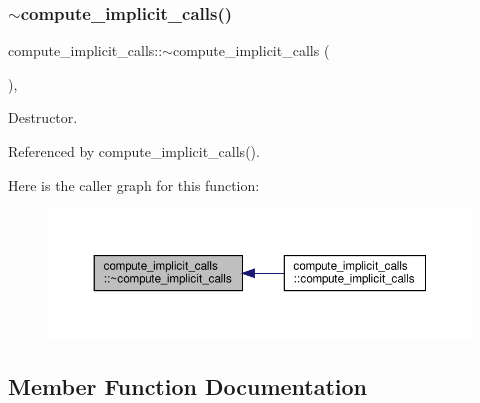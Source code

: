 \subsubsection{\texorpdfstring{$\sim$compute\+\_\+implicit\+\_\+calls()}{~compute\_implicit\_calls()}}
{\footnotesize\ttfamily compute\+\_\+implicit\+\_\+calls\+::$\sim$compute\+\_\+implicit\+\_\+calls (\begin{DoxyParamCaption}{ }\end{DoxyParamCaption})\hspace{0.3cm}{\ttfamily [override]}, {\ttfamily [default]}}



Destructor. 



Referenced by compute\+\_\+implicit\+\_\+calls().

Here is the caller graph for this function\+:
\nopagebreak
\begin{figure}[H]
\begin{center}
\leavevmode
\includegraphics[width=350pt]{db/d74/classcompute__implicit__calls_aafe777edf1545793f29518008172930d_icgraph}
\end{center}
\end{figure}


\subsection{Member Function Documentation}
\mbox{\label{classcompute__implicit__calls_a5b072707f48af9376c922af6479ffb0a}} 
